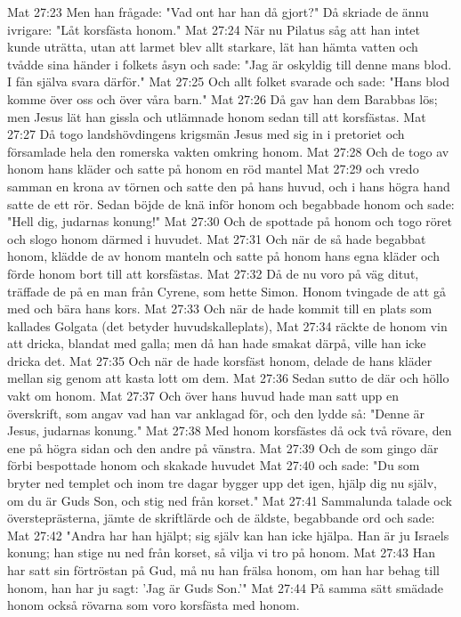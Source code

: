 Mat 27:23  Men han frågade: "Vad ont har han då gjort?" Då skriade de ännu ivrigare: "Låt korsfästa honom."
Mat 27:24  När nu Pilatus såg att han intet kunde uträtta, utan att larmet blev allt starkare, lät han hämta vatten och tvådde sina händer i folkets åsyn och sade: "Jag är oskyldig till denne mans blod. I fån själva svara därför."
Mat 27:25  Och allt folket svarade och sade: "Hans blod komme över oss och över våra barn."
Mat 27:26  Då gav han dem Barabbas lös; men Jesus lät han gissla och utlämnade honom sedan till att korsfästas.
Mat 27:27  Då togo landshövdingens krigsmän Jesus med sig in i pretoriet och församlade hela den romerska vakten omkring honom.
Mat 27:28  Och de togo av honom hans kläder och satte på honom en röd mantel
Mat 27:29  och vredo samman en krona av törnen och satte den på hans huvud, och i hans högra hand satte de ett rör. Sedan böjde de knä inför honom och begabbade honom och sade: "Hell dig, judarnas konung!"
Mat 27:30  Och de spottade på honom och togo röret och slogo honom därmed i huvudet.
Mat 27:31  Och när de så hade begabbat honom, klädde de av honom manteln och satte på honom hans egna kläder och förde honom bort till att korsfästas.
Mat 27:32  Då de nu voro på väg ditut, träffade de på en man från Cyrene, som hette Simon. Honom tvingade de att gå med och bära hans kors.
Mat 27:33  Och när de hade kommit till en plats som kallades Golgata (det betyder huvudskalleplats),
Mat 27:34  räckte de honom vin att dricka, blandat med galla; men då han hade smakat därpå, ville han icke dricka det.
Mat 27:35  Och när de hade korsfäst honom, delade de hans kläder mellan sig genom att kasta lott om dem.
Mat 27:36  Sedan sutto de där och höllo vakt om honom.
Mat 27:37  Och över hans huvud hade man satt upp en överskrift, som angav vad han var anklagad för, och den lydde så: "Denne är Jesus, judarnas konung."
Mat 27:38  Med honom korsfästes då ock två rövare, den ene på högra sidan och den andre på vänstra.
Mat 27:39  Och de som gingo där förbi bespottade honom och skakade huvudet
Mat 27:40  och sade: "Du som bryter ned templet och inom tre dagar bygger upp det igen, hjälp dig nu själv, om du är Guds Son, och stig ned från korset."
Mat 27:41  Sammalunda talade ock översteprästerna, jämte de skriftlärde och de äldste, begabbande ord och sade:
Mat 27:42  "Andra har han hjälpt; sig själv kan han icke hjälpa. Han är ju Israels konung; han stige nu ned från korset, så vilja vi tro på honom.
Mat 27:43  Han har satt sin förtröstan på Gud, må nu han frälsa honom, om han har behag till honom, han har ju sagt: 'Jag är Guds Son.'"
Mat 27:44  På samma sätt smädade honom också rövarna som voro korsfästa med honom.
